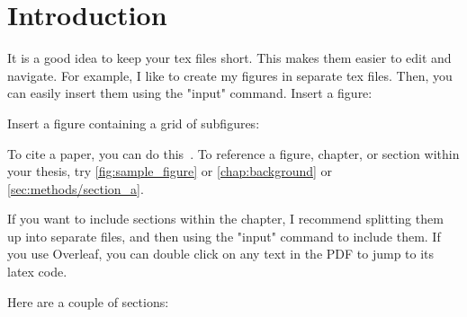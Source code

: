\chapter{Introduction}
\label{chap:introduction}

It is a good idea to keep your tex files short.
This makes them easier to edit and navigate.
For example, I like to create my figures in separate tex files.
Then, you can easily insert them using the "input" command.
Insert a figure:



\clearpage %

Insert a figure containing a grid of subfigures:



\FloatBarrier

To cite a paper, you can do this~\cite{ioffe2015batch}.
To reference a figure, chapter, or section within your thesis, try
\cref{fig:sample_figure} or
\cref{chap:background} or
\cref{sec:methods/section_a}.

If you want to include sections within the chapter,
I recommend splitting them up into separate files,
and then using the "input" command to include them.
If you use Overleaf,
you can double click on any text in the PDF to jump to its latex code.

Here are a couple of sections:






